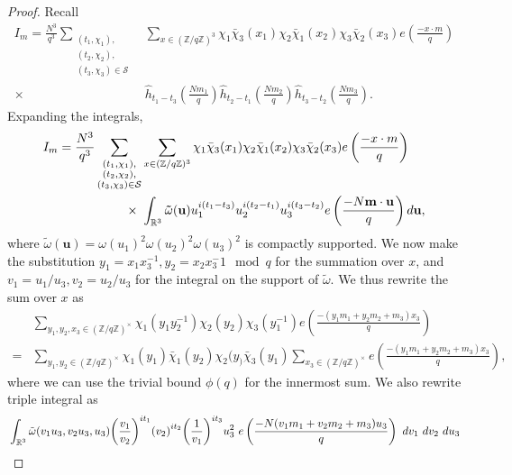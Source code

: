 \begin{proof}
    
Recall
\begin{align*}
    I_m=\frac{N^3}{q^3}\sum_{\substack{(t_1,\chi_1),\\(t_2,\chi_2),\\(t_3,\chi_3)\in\mathcal{S}}} &\sum_{x\in (\mathbb{Z}/q\mathbb{Z})^3}\chi_1\bar{\chi}_3(x_1)\chi_2\bar{\chi}_1(x_2)\chi_3\bar{\chi}_2(x_3) e\left(\frac{-x\cdot m}{q}\right)\\
    \times \ &\hat{h}_{t_1-t_3}\left(\frac{Nm_1}{q}\right)\hat{h}_{t_2-t_1}\left(\frac{Nm_2}{q}\right)\hat{h}_{t_3-t_2}\left(\frac{Nm_3}{q}\right).
\end{align*}
Expanding the integrals, 
\begin{align*}
    I_m=\frac{N^3}{q^3}\sum_{\substack{(t_1,\chi_1),\\(t_2,\chi_2),\\(t_3,\chi_3)\in\mathcal{S}}} &\sum_{x\in (\mathbb{Z}/q\mathbb{Z})^3}\chi_1\bar{\chi}_3(x_1)\chi_2\bar{\chi}_1(x_2)\chi_3\bar{\chi}_2(x_3) e\left(\frac{-x\cdot m}{q}\right)\\
    \times \ &
    \int_{\mathbb{R}^3}\mathbf{\tilde{\omega}}(\mathbf{u})u_1^{i(t_1-t_3)}u_2^{i(t_2-t_1)}u_3^{i(t_3-t_2)}e\left(\frac{-N\mathbf{m}\cdot \mathbf{u}}{q}\right)d\mathbf{u},
\end{align*}
where $\tilde{\omega}(\mathbf{u})=\omega(u_1)^2\omega(u_2)^2\omega(u_3)^2$ is compactly supported.
We now make the substitution $y_1=x_1x_3^{-1}, y_2=x_2x_3^-1 \mod q$ for the summation over $x$, and $v_1=u_1/u_3,v_2=u_2/u_3$ for the integral on the support of $\tilde{\omega}$.
We thus rewrite the sum over $x$ as 
\begin{align*}
    &\sum_{y_1,y_2,x_3\in (\mathbb{Z}/q\mathbb{Z})^\times}
    \chi_1(y_1y_2^{-1})\chi_2(y_2)\chi_3(y_1^{-1})e\left(\frac{-(y_1m_1+y_2m_2+m_3)x_3}{q}\right)\\
    =&
    \sum_{y_1,y_2\in (\mathbb{Z}/q\mathbb{Z})^\times}\chi_1(y_1)\bar{\chi}_1(y_2)\chi_2(y_)\bar{\chi}_3(y_1)\sum_{x_3\in (\mathbb{Z}/q\mathbb{Z})^\times}e\left(\frac{-(y_1m_1+y_2m_2+m_3)x_3}{q}\right),
\end{align*}
where we can use the trivial bound $\phi(q)$ for the innermost sum.
We also rewrite triple integral as 
\begin{align*}
    &\int_{\reals^3}\tilde{\omega}(v_1u_3,v_2u_3,u_3) {\left(\frac{v_1}{v_2}\right)}^{it_1} {\left(v_2\right)}^{it_2}{\left(\frac{1}{v_1}\right)}^{it_3} u_3^2 \ e\left(\frac{-N(v_1m_1+v_2m_2+m_3)u_3}{q}\right)\ dv_1\ dv_2\ du_3\\

\end{align*}
\end{proof}
